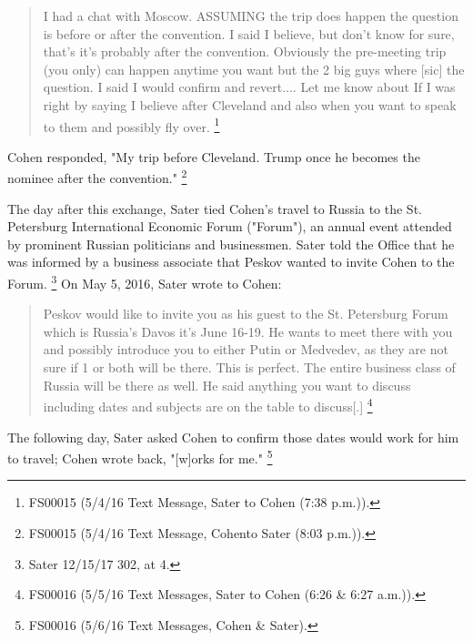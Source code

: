 \begin{quote}
I had a chat with Moscow.
ASSUMING the trip does happen the question is before or after the convention.
I said I believe, but don't know for sure, that's it's probably after the convention.
Obviously the pre-meeting trip (you only) can happen anytime you want but the 2 big guys where [sic] the question.
I said I would confirm and revert....
Let me know about If I was right by saying I believe after Cleveland and also when you want to speak to them and possibly fly over.%
\footnote{FS00015 (5/4/16 Text Message, Sater to Cohen (7:38 p.m.)).}
\end{quote}

Cohen responded, "My trip before Cleveland.
Trump once he becomes the nominee after the convention."%
\footnote{FS00015 (5/4/16 Text Message, Cohento Sater (8:03 p.m.)).}

The day after this exchange, Sater tied Cohen's travel to Russia to the St. Petersburg International Economic Forum ("Forum"), an annual event attended by prominent Russian politicians and businessmen.
Sater told the Office that he was informed by a business associate that Peskov wanted to invite Cohen to the Forum.%
\footnote{Sater 12/15/17 302, at 4.}
On May 5, 2016, Sater wrote to Cohen:

\begin{quote}
Peskov would like to invite you as his guest to the St. Petersburg Forum which is Russia's Davos it's June 16-19.
He wants to meet there with you and possibly introduce you to either Putin or Medvedev, as they are not sure if 1 or both will be there.
This is perfect.
The entire business class of Russia will be there as well.
He said anything you want to discuss including dates and subjects are on the table to discuss[.]%
\footnote{FS00016 (5/5/16 Text Messages, Sater to Cohen (6:26 \& 6:27 a.m.)).}
\end{quote}

The following day, Sater asked Cohen to confirm those dates would work for him to travel; Cohen wrote back, "[w]orks for me."%
\footnote{FS00016 (5/6/16 Text Messages, Cohen \& Sater).}

